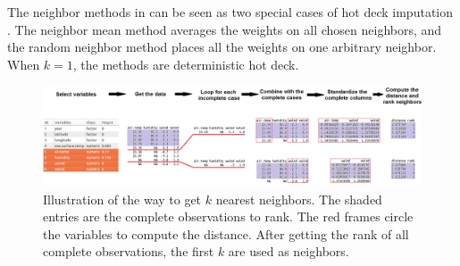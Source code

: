 \documentclass[article]{jss}
\begin{document}
The neighbor methods in  can be seen as two special cases of hot deck imputation \citep{andridge2010review}. The neighbor mean method averages the weights on all chosen neighbors, and the random neighbor method places all the weights on one arbitrary neighbor. When $k=1$, the methods are deterministic hot deck.

\begin{center}
\begin{figure}[h]
\begin{centering}
\includegraphics[width=1\textwidth]{graph/fig9-diagram}
\par\end{centering}
\caption{Illustration of the way to get $k$ nearest neighbors. The shaded entries are the complete observations to rank. The red frames circle the variables to compute the distance. After getting the rank of all complete observations, the first $k$ are used as neighbors. }
\label{fig:neighbor-diagram}
\end{figure}
\par\end{center}
\end{document}
